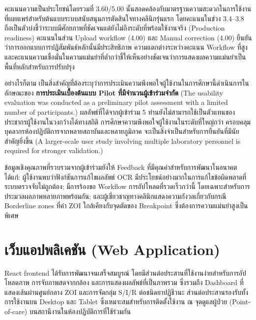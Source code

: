คะแนนความเป็นประโยชน์โดยรวมที่ 3.60/5.00 นั้นสอดคล้องกับมาตรฐานความสะดวกในการใช้งานที่เผยแพร่สำหรับต้นแบบระบบสนับสนุนการตัดสินใจทางคลินิกรุ่นแรก โดยคะแนนในช่วง 3.4--3.8 ถือเป็นตัวบ่งชี้ว่าระบบมีศักยภาพที่ชัดเจนแต่ยังไม่ถึงระดับที่พร้อมใช้งานจริง (Production readiness) \cite{rajasekar2023} คะแนนในส่วน Upload workflow (4.00) และ Manual correction (4.00) ยืนยันว่าการออกแบบการปฏิสัมพันธ์หลักนั้นมีประสิทธิภาพ ความแตกต่างระหว่างคะแนน Workflow ที่สูงและคะแนนความเชื่อมั่นในความแม่นยำที่ต่ำกว่าชี้ให้เห็นอย่างชัดเจนว่าการแสดงผลความแม่นยำเป็นพื้นที่หลักสำหรับการปรับปรุง

อย่างไรก็ตาม เป็นสิ่งสำคัญที่ต้องระบุว่าการประเมินความพึงพอใจผู้ใช้งานในการศึกษานี้ดำเนินการในลักษณะของ \textbf{การประเมินเบื้องต้นแบบ Pilot ที่มีจำนวนผู้เข้าร่วมจำกัด} (The usability evaluation was conducted as a preliminary pilot assessment with a limited number of participants.) ผลลัพธ์ที่ได้จากผู้เข้าร่วม 5 ท่านยังไม่สามารถใช้เป็นตัวแทนของประชากรผู้ใช้งานในวงกว้างได้ทางสถิติ การศึกษาความพึงพอใจผู้ใช้งานในระดับที่ใหญ่กว่า ครอบคลุมบุคลากรห้องปฏิบัติการจากหลายสถาบันและหลายภูมิภาค จะเป็นสิ่งจำเป็นสำหรับการยืนยันที่มีนัยสำคัญยิ่งขึ้น (A larger-scale user study involving multiple laboratory personnel is required for stronger validation.)

ข้อมูลเชิงคุณภาพที่รวบรวมจากผู้เข้าร่วมยังให้ Feedback ที่มีคุณค่าสำหรับการพัฒนาในอนาคต ได้แก่: ผู้ใช้งานพบว่าฟังก์ชันการแก้ไขผลลัพธ์ OCR มีประโยชน์อย่างมากในการแก้ไขข้อผิดพลาดที่ระบบตรวจจับไม่ถูกต้อง; มีการร้องขอ Workflow การอัปโหลดที่รวดเร็วกว่านี้ โดยเฉพาะสำหรับการประมวลผลภาพหลายภาพพร้อมกัน; และผู้เชี่ยวชาญทางคลินิกแสดงความกังวลเกี่ยวกับกรณี Borderline zones ที่ค่า ZOI ใกล้เคียงกับจุดตัดของ Breakpoint ซึ่งต้องการความแม่นยำสูงเป็นพิเศษ

\section{เว็บแอปพลิเคชัน (Web Application)}
\label{sec:webapp}

React frontend ได้รับการพัฒนาจนเสร็จสมบูรณ์ โดยมีส่วนต่อประสานที่ใช้งานง่ายสำหรับการอัปโหลดภาพ การจับภาพสดจากกล้อง และการแสดงผลลัพธ์ที่เป็นภาพรวม ซึ่งรวมถึง Dashboard ที่แสดงเส้นผ่านศูนย์กลาง ZOI และการจัดกลุ่ม S/I/R ต่อชนิดยาปฏิชีวนะ ส่วนต่อประสานรองรับทั้งการใช้งานบน Desktop และ Tablet ซึ่งเหมาะสมสำหรับการติดตั้งใช้งาน ณ จุดดูแลผู้ป่วย (Point-of-care) บนสถานีงานในห้องปฏิบัติการที่ใช้ร่วมกัน

